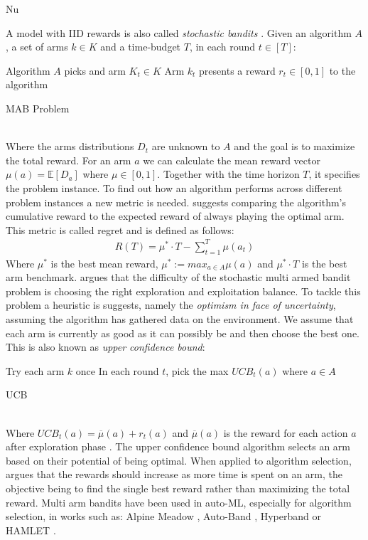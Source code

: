 Nu\documentclass[11pt,twoside, a4paper]{report}
\begin{document}
A model with IID rewards is also called \emph{stochastic bandits} \parencite{Slivkins2019}. 
\tab Given an algorithm $A$, a set of arms $k \in K$ and a time-budget $T$, in each round $t \in [T]$:
\begin{algorithm}[hbt!]
\SetAlgoLined
Algorithm $A$ picks and arm $K_t \in K$ \; 
Arm $k_t$ presents a reward $r_t \in [0,1]$ to the algorithm
 \caption{MAB Problem}
\end{algorithm} \\
Where the arms distributions $D_t$ are unknown to $A$ and the goal is to maximize the total reward. For an arm $a$ we can calculate the mean reward vector $\mu(a)=\mathbb{E}[D_a]$ where $\mu \in [0, 1]$. Together with the time horizon $T$, it specifies the problem instance. To find out how an algorithm performs across different problem instances a new metric is needed. \cite{Slivkins2019} suggests comparing the algorithm's cumulative reward to the expected reward of always playing the optimal arm. This metric is called regret and is defined as follows:
\begin{align*}
    R(T) = \mu^* \cdot T - \sum_{t=1}^{T} \mu(a_t)
\end{align*}
Where $\mu^*$ is the best mean reward, $\mu^* := max_{a \in A}\mu(a)$ and $\mu^* \cdot T$ is the best arm benchmark.
\cite{Bubeck2012} argues that the difficulty of the stochastic multi armed bandit problem is choosing the right exploration and exploitation balance. To tackle this problem a heuristic is suggests, namely the \emph{optimism in face of uncertainty}, assuming the algorithm has gathered data on the environment. We assume that each arm is currently as good as it can possibly be and then choose the best one. This is also known as \emph{upper confidence bound}: 
\begin{algorithm}[hbt!]
\SetAlgoLined
Try each arm $k$ once \;
In each round $t$, pick the max $UCB_t(a)$ where $a \in A$
 \caption{UCB}
\end{algorithm} \\
Where $UCB_t(a) = \overline{\mu}(a) + r_t(a)$ and $\overline{\mu}(a)$ is the reward for each action $a$ after exploration phase \parencite{Slivkins2019}.
The upper confidence bound algorithm selects an arm based on their potential of being optimal. When applied to algorithm selection,  argues that the rewards should increase as more time is spent on an arm, the objective being to find the single best reward rather than maximizing the total reward. Multi arm bandits have been used in auto-ML, especially for algorithm selection, in works such as: Alpine Meadow \parencite{Shang2019a}, Auto-Band \parencite{DasDores2018}, Hyperband \parencite{Li2018} or HAMLET \parencite{Schmidt2020}. 
 
\end{document}
